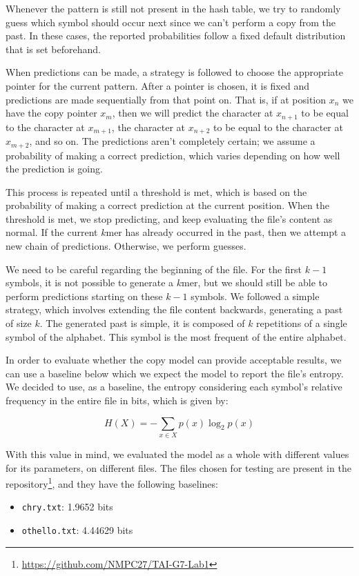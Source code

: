 \documentclass{article}
\begin{document}
Whenever the pattern is still not present in the hash table, we try to randomly guess which symbol should occur next since we can't perform a copy from the past.
In these cases, the reported probabilities follow a fixed default distribution that is set beforehand.

When predictions can be made, a strategy is followed to choose the appropriate pointer for the current pattern.
After a pointer is chosen, it is fixed and predictions are made sequentially from that point on.
That is, if at position $x_n$ we have the copy pointer $x_m$, then we will predict the character at $x_{n+1}$ to be equal to the character at $x_{m+1}$, the character at $x_{n+2}$ to be equal to the character at $x_{m+2}$, and so on.
The predictions aren't completely certain; we assume a probability of making a correct prediction, which varies depending on how well the prediction is going.

This process is repeated until a threshold is met, which is based on the probability of making a correct prediction at the current position.
When the threshold is met, we stop predicting, and keep evaluating the file's content as normal.
If the current $k$mer has already occurred in the past, then we attempt a new chain of predictions.
Otherwise, we perform guesses.

We need to be careful regarding the beginning of the file.
For the first $k-1$ symbols, it is not possible to generate a $k$mer, but we should still be able to perform predictions starting on these $k-1$ symbols.
We followed a simple strategy, which involves extending the file content backwards, generating a past of size $k$.
The generated past is simple, it is composed of $k$ repetitions of a single symbol of the alphabet.
This symbol is the most frequent of the entire alphabet.

In order to evaluate whether the copy model can provide acceptable results, we can use a baseline below which we expect the model to report the file's entropy.
We decided to use, as a baseline, the entropy considering each symbol's relative frequency in the entire file in bits, which is given by:

$$
H(X) = - \sum_{x \in X}{p(x) \log_{2}{p(x)}}
$$

With this value in mind, we evaluated the model as a whole with different values for its parameters, on different files.
The files chosen for testing are present in the repository\footnote{\url{https://github.com/NMPC27/TAI-G7-Lab1}}, and they have the following baselines:
\begin{itemize}
    \item \verb|chry.txt|: 1.9652 bits
    \item \verb|othello.txt|: 4.44629 bits
\end{itemize}
\end{document}
